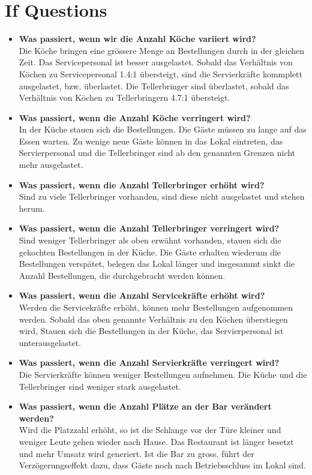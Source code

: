 \documentclass[ngerman,a4paper,12pt]{scrreprt}
\begin{document}
	\section{If Questions}
		\begin{itemize}
			\item \textbf{Was passiert, wenn wir die Anzahl Köche variiert wird?} \\
				Die Köche bringen eine grössere Menge an Bestellungen durch in der gleichen Zeit. Das Servicepersonal ist besser ausgelastet. Sobald das Verhältnis von Köchen zu Servicepersonal 1.4:1 übersteigt, sind die Servierkräfte kommplett ausgelastet, bzw. überlastet. Die Tellerbringer sind überlastet, sobald das Verhältnis von Köchen zu Tellerbringern 4.7:1 übersteigt.
			\item \textbf{Was passiert, wenn die Anzahl Köche verringert wird?} \\
				In der Küche stauen sich die Bestellungen. Die Gäste müssen zu lange auf das Essen warten. Zu wenige neue Gäste können in das Lokal eintreten, das Servierpersonal und die Tellerbringer sind ab den genannten Grenzen nicht mehr ausgelastet.
			\item \textbf{Was passiert, wenn die Anzahl Tellerbringer erhöht wird?}\\
				Sind zu viele Tellerbringer vorhanden, sind diese nicht ausgelastet und stehen herum.
			\item \textbf{Was passiert, wenn die Anzahl Tellerbringer verringert wird?}\\
				Sind weniger Tellerbringer als oben erwähnt vorhanden, stauen sich die gekochten Bestellungen in der Küche. Die Gäste erhalten wiederum die Bestellungen verspätet, belegen das Lokal länger und insgesammt sinkt die Anzahl Bestellungen, die durchgebracht werden können.
			\item \textbf{Was passiert, wenn die Anzahl Servicekräfte erhöht wird?}\\
				Werden die Servicekräfte erhöht, können mehr Bestellungen aufgenommen werden. Sobald das oben genannte Verhältnis zu den Köchen überstiegen wird, Stauen sich die Bestellungen in der Küche, das Servierpersonal ist unterausgelastet.
			\item \textbf{Was passiert, wenn die Anzahl Servierkräfte verringert wird?}\\
				Die Servierkräfte können weniger Bestellungen aufnehmen. Die Küche und die Tellerbringer sind weniger stark ausgelastet.
			\item \textbf{Was passiert, wenn die Anzahl Plätze an der Bar verändert werden?}\\
				Wird die Platzzahl erhöht, so ist die Schlange vor der Türe kleiner und weniger Leute gehen wieder nach Hause. Das Restaurant ist länger besetzt und mehr Umsatz wird generiert. Ist die Bar zu gross, führt der Verzögerungseffekt dazu, dass Gäste noch nach Betriebsschluss im Lokal sind.
				

\end{itemize}
\end{document}
